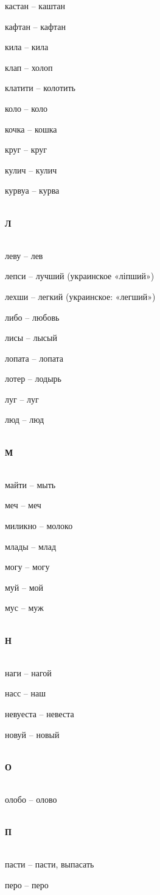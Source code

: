 \begin{multicols}{2}
кастан – каштан

кафтан – кафтан

кила – кила

клап – холоп

клатити – колотить

коло – коло

кочка – кошка

круг – круг

кулич – кулич

курвуа – курва

\mbox{ }\\
\textbf{Л}\\
\mbox{ }

леву – лев

лепси – лучший (украинское «ліпший»)

лехши – легкий (украинское: «легший»)

либо – любовь

лисы – лысый

лопата – лопата

лотер – лодырь

луг – луг

люд – люд

\mbox{ }\\
\textbf{М}\\
\mbox{ }

майти – мыть

меч – меч

миликно – молоко

млады – млад

могу – могу

муй – мой

мус – муж

\mbox{ }\\
\textbf{Н}\\
\mbox{ }

наги – нагой

насс – наш

невуеста – невеста

новуй – новый

\mbox{ }\\
\textbf{О}\\
\mbox{ }

олобо – олово

\mbox{ }\\
\textbf{П}\\
\mbox{ }

пасти – пасти, выпасать

перо – перо


\end{multicols}
